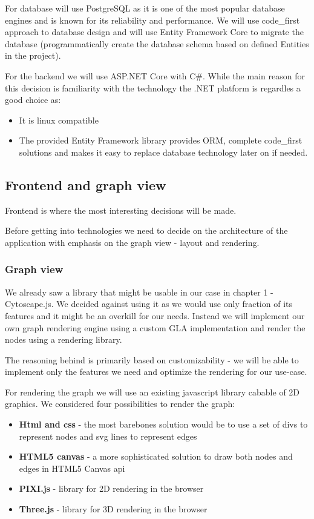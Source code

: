 For database will use PostgreSQL as it is one of the most popular database engines and is known for its reliability and performance.
We will use \gls{code_first} approach to database design and will use Entity Framework Core to migrate the database
(programmatically create the database schema based on defined Entities in the project).

For the backend we will use ASP.NET Core with C\#.
While the main reason for this decision is familiarity with the technology the .NET platform is regardles a good choice as:
\begin{itemize}
    \item It is linux compatible
    \item The provided Entity Framework library provides \gls{ORM}, complete \gls{code_first} solutions and makes it easy to replace database technology later on if needed.
\end{itemize}

\subsection{Frontend and graph view}
Frontend is where the most interesting decisions will be made.

Before getting into technologies we need to decide on the architecture of the application with emphasis on the
graph view - layout and rendering.

\subsubsection{Graph view}
We already saw a library that might be usable in our case in chapter 1 - Cytoscape.js.
We decided against using it as we would use only fraction of its features and it might be an overkill for our needs.
Instead we will implement our own graph rendering engine using a custom \gls{GLA}
implementation and render the nodes using a rendering library.

The reasoning behind is primarily based on customizability
- we will be able to implement only the features we need and optimize the rendering for our use-case.

For rendering the graph we will use an existing javascript library cabable of 2D graphics.
We considered four possibilities to render the graph:
\begin{itemize}
    \item \textbf{Html and css} - the most barebones solution would be to use a set of divs to represent nodes and svg lines to represent edges
    \item \textbf{HTML5 canvas} - a more sophisticated solution to draw both nodes and edges in HTML5 Canvas api
    \item \textbf{PIXI.js} - library for 2D rendering in the browser
    \item \textbf{Three.js} - library for 3D rendering in the browser
\end{itemize}

